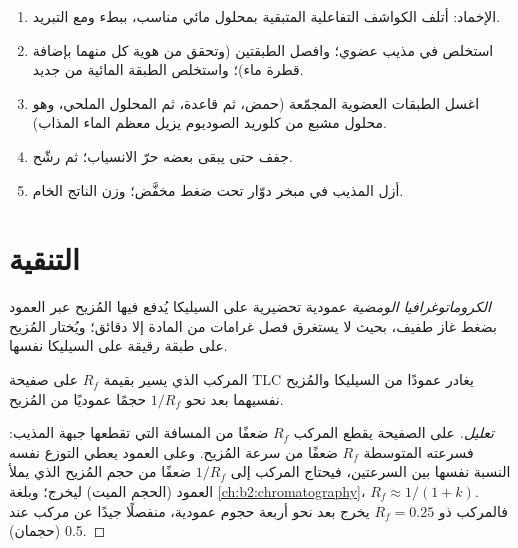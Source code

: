 \begin{method}\label{met:b2:lab-techniques-2:work-up}
\begin{enumerate}
  \item الإخماد: أتلف الكواشف التفاعلية المتبقية بمحلول مائي مناسب، ببطء ومع
        التبريد.
  \item استخلص في مذيب عضوي؛ وافصل الطبقتين (وتحقق من هوية كل منهما بإضافة قطرة
        ماء)؛ واستخلص الطبقة المائية من جديد.
  \item اغسل الطبقات العضوية المجمّعة (حمض، ثم قاعدة، ثم المحلول الملحي، وهو محلول مشبع من كلوريد الصوديوم
        يزيل معظم الماء المذاب).
  \item جفف  حتى يبقى بعضه حرّ الانسياب؛ ثم رشّح.
  \item أزل المذيب في مبخر دوّار تحت ضغط مخفَّض؛ وزن الناتج الخام.
\end{enumerate}
\end{method}

\section{التنقية}

\begin{definition}\label{def:b2:lab-techniques-2:flash}
\emph{الكروماتوغرافيا الومضية}  عمودية تحضيرية على السيليكا
يُدفع فيها المُزيح عبر العمود بضغط غاز طفيف، بحيث لا يستغرق فصل غرامات
من المادة إلا دقائق؛ ويُختار المُزيح  على طبقة رقيقة على السيليكا نفسها.
\end{definition}

\begin{proposition}\label{prop:b2:lab-techniques-2:column-volumes}
المركب الذي يسير بقيمة $R_f$ على صفيحة TLC يغادر عمودًا من السيليكا والمُزيح نفسيهما بعد
نحو $1/R_f$ حجمًا عموديًا من المُزيح.
\end{proposition}

\begin{proof}[تعليل]
على الصفيحة يقطع المركب $R_f$ ضعفًا من المسافة التي تقطعها جبهة المذيب: فسرعته المتوسطة $R_f$
ضعفًا من سرعة المُزيح. وعلى العمود يعطي التوزع نفسه النسبة نفسها بين السرعتين، فيحتاج
المركب إلى $1/R_f$ ضعفًا من حجم المُزيح الذي يملأ العمود (الحجم الميت) ليخرج؛
وبلغة \cref{ch:b2:chromatography}، $R_f \approx 1/(1 + k)$. فالمركب ذو $R_f = 0.25$
يخرج بعد نحو أربعة حجوم عمودية، منفصلًا جيدًا عن مركب عند 0.5 (حجمان).
\end{proof}

